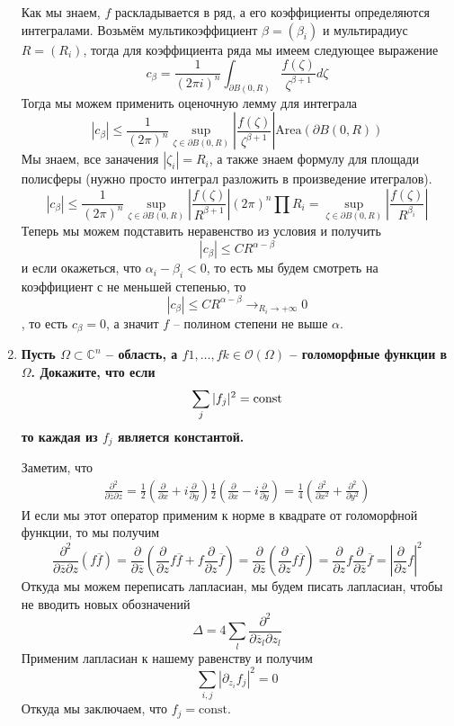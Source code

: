 \documentclass{article}
\begin{document}
\begin{enumerate}
        Как мы знаем, $f$ раскладывается в ряд, а его коэффициенты определяются
        интегралами. Возьмём мультикоэффициент $\beta=(\beta_i)$ и мультирадиус
        $R=(R_i)$, тогда для коэффициента ряда мы имеем следующее выражение
        \[c_\beta=\frac{1}{(2\pi i)^n}\int_{\partial B(0,R)}\frac{f(\zeta)}{\zeta^{\beta+1}}d\zeta\]
        Тогда мы можем применить оценочную лемму для интеграла
        \[|c_\beta|\leq\frac{1}{(2\pi)^n}\sup_{\zeta\in\partial B(0,R)}|\frac{f(\zeta)}{\zeta^{\beta+1}}|\text{Area}(\partial B(0,R))\]
        Мы знаем, все заначения $|\zeta_i|=R_i$, а также
        знаем формулу для площади полисферы (нужно просто интеграл разложить в произведение итегралов).
        \[|c_\beta|\leq\frac{1}{(2\pi)^n}\sup_{\zeta\in\partial B(0,R)}|\frac{f(\zeta)}{R^{\beta+1}}|(2\pi)^n\prod R_i
        =\sup_{\zeta\in\partial B(0,R)}|\frac{f(\zeta)}{R^{\beta_i}}|\]
        Теперь мы можем подставить неравенство из условия и получить
        \[|c_\beta|\leq CR^{\alpha-\beta}\]
        и если окажеться, что $\alpha_i-\beta_i<0$, то есть мы будем
        смотреть на коэффициент с не меньшей степенью, то
        \[|c_\beta|\leq CR^{\alpha-\beta}\rightarrow_{R_i\rightarrow+\infty}0\],
        то есть $c_\beta=0$, а значит $f$ – полином степени не выше $\alpha$.


    \item \textbf{Пусть $\Omega⊂\mathbb C^n$ – область, а $f1,\ldots,fk\in\mathcal
        O(\Omega)$ – голоморфные функции в $\Omega$. Докажите, что если
        \[\sum_j |f_j|^2=\textnormal{const}\]
        то каждая из $f_j$ является константой.}

        Заметим, что 
        \begin{align*}
            \frac{\partial^2}{\partial\overline z\partial z}=
            \frac{1}{2}\left(\frac{\partial}{\partial x}+i\frac{\partial}{\partial y}\right)
            \frac{1}{2}\left(\frac{\partial}{\partial x}-i\frac{\partial}{\partial y}\right)=
            \frac{1}{4}\left(\frac{\partial^2}{\partial x^2}+\frac{\partial^2}{\partial y^2}\right)
        \end{align*}
        И если мы этот оператор применим к норме в квадрате от голоморфной функции,
        то мы получим
        \[\frac{\partial^2}{\partial\overline z\partial z}(f\overline f)=
        \frac{\partial}{\partial\overline z}(\frac{\partial}{\partial z}f\overline f+
        f\frac{\partial}{\partial z}\overline f)=
        \frac{\partial}{\partial\overline z}(\frac{\partial}{\partial z}f\overline f)=
        \frac{\partial}{\partial z}f\frac{\partial}{\partial\overline z}\overline f=
        \left|\frac{\partial}{\partial z}f\right|^2\]
        Откуда мы можем переписать лапласиан, мы будем писать лапласиан, чтобы не
        вводить новых обозначений
        \[\Delta=4\sum_l\frac{\partial^2}{\partial\overline z_l\partial z_l}\]
        Применим лапласиан к нашему равенству и получим
        \[\sum_{i,j} |\partial_{z_i} f_j|^2=0\]
        Откуда мы заключаем, что $f_j=\text{const}$.
        

\end{enumerate}
\end{document}
